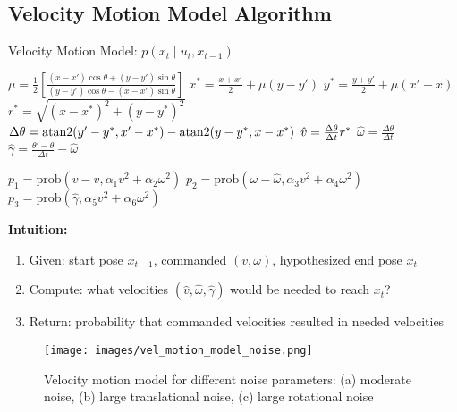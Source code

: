 \subsection{Velocity Motion Model Algorithm}

\begin{algorithm}[H]
\caption{Velocity Motion Model: $p(x_t \mid u_t, x_{t-1})$}
\BlankLine
{}
\BlankLine
$\mu = \frac{1}{2}\left[\frac{(x - x')\cos \theta + (y - y') \sin \theta}{(y - y') \cos \theta - (x - x')\sin \theta}\right]$\;
\BlankLine
$x^* = \frac{x+x'}{2} + \mu (y-y')$\;
\BlankLine
$y^* = \frac{y+y'}{2} + \mu (x'-x)$\;
\BlankLine
$r^* = \sqrt{(x-x^*)^2 + (y-y^*)^2}$\;
\BlankLine
$\Delta \theta = \operatorname{atan2}(y' - y^*,x'-x^*)- \operatorname{atan2}(y-y^*, x-x^*)$\;
\BlankLine
$\hat{v} = \frac{\Delta \theta}{\Delta t} r^*$\;
\BlankLine
$\hat{\omega} = \frac{\Delta \theta}{\Delta t}$\;
\BlankLine
$\hat{\gamma} = \frac{\theta' - \theta}{\Delta t} - \hat{\omega}$\;

\BlankLine
{}
$p_1 = \text{prob}(v - \hat{v}, \alpha_1 v^2 + \alpha_2 \omega^2)$\;
$p_2 = \text{prob}(\omega - \hat{\omega}, \alpha_3 v^2 + \alpha_4 \omega^2)$\;
$p_3 = \text{prob}(\hat{\gamma}, \alpha_5 v^2 + \alpha_6 \omega^2)$\;

\BlankLine
{}
\end{algorithm}

\textbf{Intuition:}
\begin{enumerate}
    \item Given: start pose $x_{t-1}$, commanded $(v, \omega)$, hypothesized end pose $x_t$
    \item Compute: what velocities $(\hat{v}, \hat{\omega}, \hat{\gamma})$ would be needed to reach $x_t$?
    \item Return: probability that commanded velocities resulted in needed velocities
\end{enumerate}

\begin{figure}[H]
  \begin{center}
    \texttt{[image: images/vel\_motion\_model\_noise.png]}
  \end{center}
  \caption{Velocity motion model for different noise parameters: (a) moderate noise, (b) large translational noise, (c) large rotational noise}
\end{figure}


